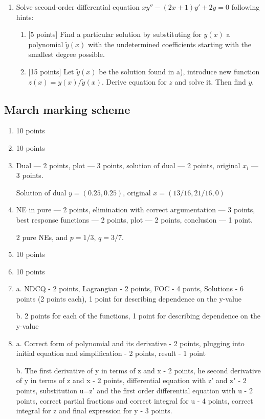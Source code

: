 \documentclass[12pt]{article} %
\theoremstyle{definition} %
\begin{document}
\begin{enumerate}
\item Solve second-order differential equation $xy''-(2x+1)y'+2y=0$ following hints:
	\begin{enumerate}[label=\alph*)]
	    \item {[5 points]} Find a particular solution by substituting for $y(x)$ a polynomial $\tilde y(x)$ with
	      the undetermined coefficients starting with the smallest degree possible.
	    \item {[15 points]} Let $\tilde y(x)$  be the solution found in a),  introduce new function $z(x)=y(x)/\tilde y(x)$.
	      Derive equation for $z$ and solve it. Then find $y$.
	  \end{enumerate}


\end{enumerate}

\subsection{March marking scheme}

\begin{enumerate}

\item 10 points
\item 10 points
\item Dual — 2 points, plot — 3 points, solution of dual — 2 points, original $x_i$ — 3 points.

Solution of dual $y = (0.25, 0.25)$, original $x = (13/16, 21/16, 0)$

\item NE in pure — 2 points, elimination with correct argumentation — 3 points, best response functions — 2 points, plot — 2 points, conclusion — 1 point.

2 pure NEs, and $p=1/3$, $q=3/7$.

\item 10 points
\item 10 points

\item
a. NDCQ - 2 points, Lagrangian - 2 points, FOC - 4 ponts, Solutions  - 6 points (2 points each), 1 point for describing dependence on the y-value

b. 2 points for each of the functions, 1 point for describing dependence on the y-value

\item
a. Correct form of polynomial and its derivative - 2 points, plugging into initial equation and simplification - 2 points, result - 1 point

b. The first derivative of y in terms of z and x - 2 points, he second derivative of y in terms of z and x - 2 points, differential equation with z' and z" - 2 points, substitution u=z' and the first order differential equation with u - 2 points, correct partial fractions and correct integral for u - 4 points, correct integral for z and final expression for y - 3 points.


\end{enumerate}
\end{document}

